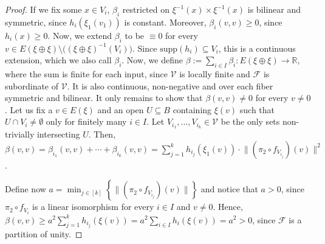 \begin{proof}
If we fix some $x\in V_i$, $\beta_i$ restricted on $\xi^{-1}(x)\times\xi^{-1}(x)$ is bilinear and symmetric, since $h_i(\xi_1(v_1))$ is constant. Moreover, $\beta_i(v,v)\geq0$, since $h_i(x)\geq0$. Now, we extend $\beta_i$ to be $\equiv0$ for every $v\in E(\xi\oplus\xi)\setminus\big((\xi\oplus\xi)^{-1}(V_i)\big)$. Since $\mathrm{supp}(h_i)\subseteq V_i$, this is a continuous extension, which we also call $\beta_i$. Now, we define $\beta:=\sum_{i\in I}\beta_i:E(\xi\oplus\xi)\to\mathbb{R}$, where the sum is finite for each input, since $\mathcal{V}$ is locally finite and $\mathcal{F}$ is subordinate of $\mathcal{V}$. It is also continuous, non-negative and over each fiber symmetric and bilinear. It only remains to show that $\beta(v,v)\neq0$ for every $v\neq0$. Let us fix a $v\in E(\xi)$ and an open $U\subseteq B$ containing $\xi(v)$ such that $U\cap V_i\neq\emptyset$ only for finitely many $i\in I$. Let $V_{i_1},\ldots,V_{i_k}\in\mathcal{V}$ be the only sets non-trivially intersecting $U$. Then,  $\beta(v,v)=\beta_{i_1}(v,v)+\cdots+\beta_{i_k}(v,v)=\sum_{j=1}^kh_{i_j}(\xi_1(v))\cdot\big\|(\pi_2\circ f_{V_{i_j}})(v)\big\|^2$.

Define now $a=\min_{j\in[k]}\left\{\big\|(\pi_2\circ f_{V_{i_j}})(v)\big\|\right\}$ and notice that $a>0$, since $\pi_2\circ f_{V_i}$ is a linear isomorphism for every $i\in I$ and $v\neq0$. Hence, $\beta(v,v)\geq a^2\sum_{j=1}^kh_{i_j}(\xi(v))=a^2\sum_{i\in I}h_i(\xi(v))=a^2>0$, since $\mathcal{F}$ is a partition of unity.
\end{proof}

